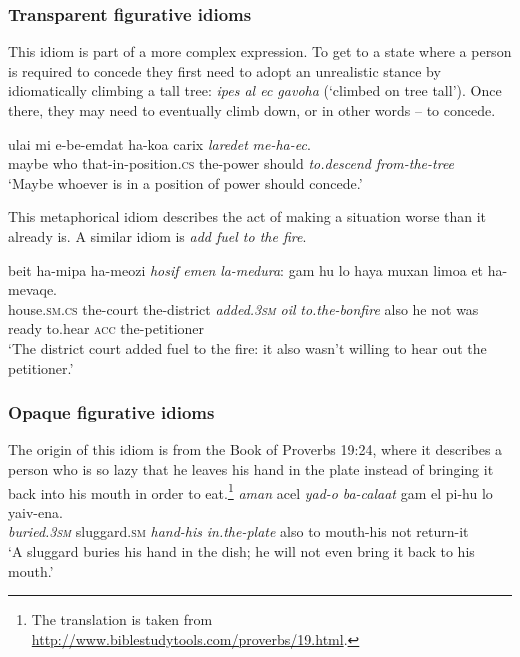 \documentclass[output=paper]{langsci/langscibook}
\begin{document}
\subsubsection{Transparent figurative idioms}
This idiom is part of a more complex expression. To get to a state where a person is required to concede they first need to adopt an unrealistic stance by idiomatically climbing a tall tree: \textit{{\tet}ipes {\ayin}al {\ayin}ec gavoha} (`climbed on tree tall'). Once there, they may need to eventually climb down, or in other words -- to concede.

	\ea\label{she:ec-canon}
    	\gll {\alef}ulai mi {\shin}e-be-{\ayin}emdat ha-koa{\het} carix \textit{laredet} \textit{me-ha-{\ayin}ec}.\\
    	   maybe who that-in-position.\textsc{cs} the-power should \textit{to.descend} \textit{from-the-tree}\\
    	\glt `Maybe whoever is in a position of power should concede.'
	\z

This metaphorical idiom describes the act of making a situation worse than it already is. A similar  idiom is \textit{add fuel to the fire}.

	\ea\label{she:medura-canon}
    	\gll beit ha-mi{\shin}pa{\tet} ha-me{\het}ozi \textit{hosif} \textit{{\shin}emen} \textit{la-medura}: gam hu lo haya muxan li{\shin}mo{\ayin}a {\alef}et ha-mevaqe{\shin}.\\
    	   house.\textsc{sm}.\textsc{cs} the-court the-district \textit{added.\textsc{3sm}} \textit{oil} \textit{to.the-bonfire} also he not was ready to.hear \textsc{acc} the-petitioner\\
    	\glt `The district court added fuel to the fire: it also wasn't willing to hear out the petitioner.'
	\z

\subsubsection{Opaque figurative idioms}

The origin of this idiom is from the Book of Proverbs 19:24, where it describes a person who is so lazy that he leaves his hand in the plate instead of bringing it back into his mouth in order to eat.\footnote{The translation is taken from \url{http://www.biblestudytools.com/proverbs/19.html}.}
    \ea\label{she:proverb}
        \gll \textit{{\tet}aman} {\ayin}acel \textit{yad-o} \textit{ba-cala{\het}at} gam {\alef}el pi-hu lo ya{\shin}iv-ena.\\
            \textit{buried.\textsc{3sm}} sluggard.\textsc{sm} \textit{hand-his} \textit{in.the-plate} also to mouth-his not return-it\\
        \glt `A sluggard buries his hand in the dish; he will not even bring it back to his mouth.'
    \z
\end{document}
